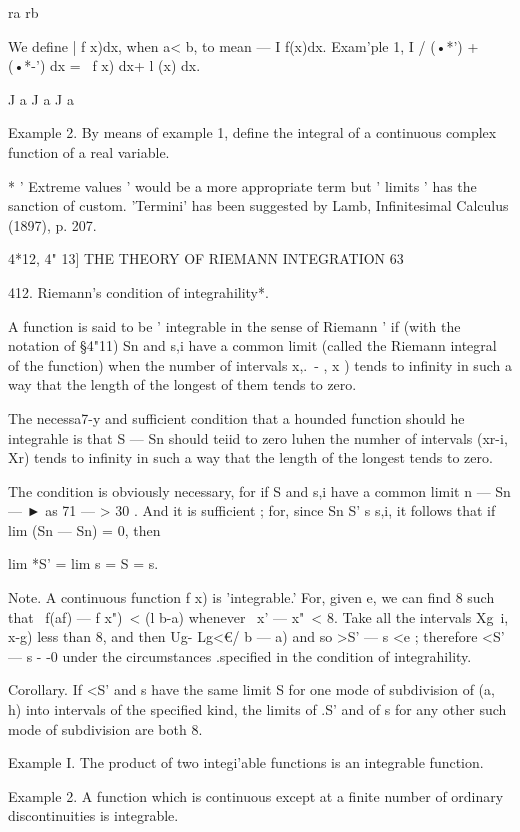 ra rb

We define | f x)dx, when a< b, to mean — I f(x)dx. Exam'ple 1, I /
(•*') + (•*-') dx = \ f x) dx+ l (x) dx.

J a J a J a

Example 2. By means of example 1, define the integral of a continuous
complex function of a real variable.

* ' Extreme values ' would be a more appropriate term but ' limits '
has the sanction of custom. 'Termini' has been suggested by Lamb,
Infinitesimal Calculus (1897), p. 207.



4*12, 4" 13] THE THEORY OF RIEMANN INTEGRATION 63

412. Riemann's condition of integrahility*.

A function is said to be ' integrable in the sense of Riemann ' if
(with the notation of §4"11) Sn and s,i have a common limit (called
the Riemann integral of the function) when the number of intervals
x,.\ - , x ) tends to infinity in such a way that the length of the
longest of them tends to zero.

The necessa7-y and sufficient condition that a hounded function should
he integrahle is that S — Sn should teiid to zero luhen the numher of
intervals (xr-i, Xr) tends to infinity in such a way that the length
of the longest tends to zero.

The condition is obviously necessary, for if S and s,i have a common
limit n — Sn — ► as 71 — > 30 . And it is sufficient ; for, since Sn
S' s s,i, it follows that if lim (Sn — Sn) = 0, then

lim *S' = lim s = S = s.

Note. A continuous function f x) is 'integrable.' For, given e, we can
find 8 such that \ f(af) — f x")\ < (l b-a) whenever \ x' — x"\ < 8.
Take all the intervals Xg\ i, x-g) less than 8, and then Ug- Lg<€/ b —
a) and so >S' — s <e ; therefore <S' — s - -0 under the circumstances
.specified in the condition of integrahility.

Corollary. If <S' and s have the same limit S for one mode of
subdivision of (a, h) into intervals of the specified kind, the limits
of .S' and of s for any other such mode of subdivision are both 8.

Example I. The product of two integi'able functions is an integrable
function.

Example 2. A function which is continuous except at a finite number of
ordinary discontinuities is integrable.


